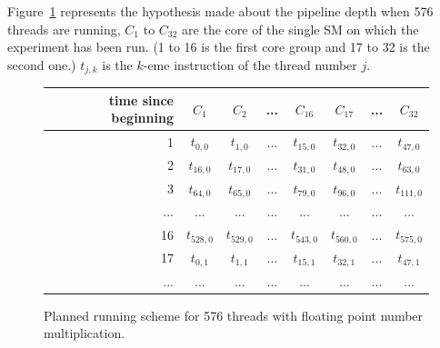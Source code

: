 \documentclass{report}
\begin{document}
    Figure~\ref{fig:fp_prediction_512}
    represents the hypothesis made about the pipeline depth when 576 threads are running, $C_1$ to
    $C_{32}$ are the core of the single SM on which the experiment has been run. (1 to 16 is the
    first core group and 17 to 32 is the second one.) $t_{j,k}$ is the $k$-eme instruction of the thread number $j$. 
        \begin{figure}[H]
      \centering
       \begin{tabular}{ | r || c | c | c | c || c | c | c | }
    	    \hline
    	    time since beginning & $C_1$ & $C_2$ & ... & $C_{16}$ & $C_{17}$ & ... & $C_{32}$ \\ \hline  \hline
    	   1 & $t_{0,0}$ & $t_{1,0}$ & ... & $t_{15,0}$ & $t_{32, 0}$ & ... & $t_{47, 0}$ \\ \hline 
    	   2 & $t_{16,0}$ & $t_{17,0}$ & ... & $t_{31,0}$ & $t_{48, 0}$ & ... & $t_{63, 0}$ \\ \hline
    	   3 & $t_{64,0}$ & $t_{65,0}$ & ... & $t_{79,0}$ & $t_{96, 0}$ & ... & $t_{111, 0}$ \\ \hline
    	   ... & ... & ... & ... & ... & ... & ... & ... \\ \hline
    	   16 & $t_{528,0}$ & $t_{529,0}$ & ... & $t_{543,0}$ & $t_{560,0}$ & ... & $t_{575, 0}$ \\ \hline
    	   17 & $t_{0,1}$ & $t_{1,1}$ & ... & $t_{15,1}$ & $t_{32, 1}$ & ... & $t_{47, 1}$ \\ \hline
    	   ... & ... & ... & ... & ... & ... & ... & ... \\ \hline
  	\end{tabular}
  	\captionsetup{justification=centering}
  	\caption{Planned running scheme for 576 threads with floating point number multiplication.}
  	\label{fig:fp_prediction_512}
   \end{figure}
   
\end{document}
